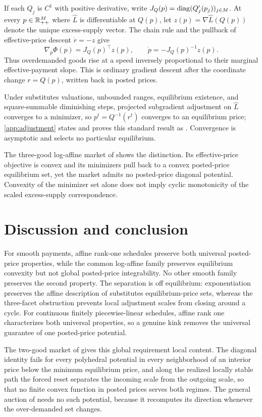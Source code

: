 If each $Q_j$ is $C^1$ with positive derivative, write $J_Q(p)=\operatorname{diag}(Q'_j(p_j))_{j\in M}$. At every $p\in\mathbb{R}_{++}^M$ where $\widehat L$ is differentiable at $Q(p)$, let $z(p)=\nabla\widehat L(Q(p))$ denote the unique excess-supply vector. The chain rule and the pullback of effective-price descent $\dot r=-z$ give
\begin{equation}\label{eq:smooth-pullback}
\nabla_p\Phi(p)=J_Q(p)^\top z(p),
\qquad
\dot p=-J_Q(p)^{-1}z(p).
\end{equation}
Thus overdemanded goods rise at a speed inversely proportional to their marginal effective-payment slope. This is ordinary gradient descent after the coordinate change $r=Q(p)$, written back in posted prices.

Under substitutes valuations, unbounded ranges, equilibrium existence, and square-summable diminishing steps, projected subgradient adjustment on $\widehat L$ converges to a minimizer, so $p^t=Q^{-1}(r^t)$ converges to an equilibrium price; \ref{app:adjustment} states and proves this standard result as . Convergence is asymptotic and selects no particular equilibrium.

The three-good log-affine market of  shows the distinction. Its effective-price objective is convex and its minimizers pull back to a convex posted-price equilibrium set, yet the market admits no posted-price diagonal potential. Convexity of the minimizer set alone does not imply cyclic monotonicity of the scaled excess-supply correspondence.

\section{Discussion and conclusion}\label{sec:discussion}

For smooth payments, affine rank-one schedules preserve both universal posted-price properties, while the common log-affine family preserves equilibrium convexity but not global posted-price integrability. No other smooth family preserves the second property. The separation is off equilibrium: exponentiation preserves the affine description of substitutes equilibrium-price sets, whereas the three-facet obstruction prevents local adjustment scales from closing around a cycle. For continuous finitely piecewise-linear schedules, affine rank one characterizes both universal properties, so a genuine kink removes the universal guarantee of one posted-price potential.

The two-good market of  gives this global requirement local content. The diagonal identity fails for every polyhedral potential in every neighborhood of an interior price below the minimum equilibrium price, and along the realized locally stable path the forced reset separates the incoming scale from the outgoing scale, so that no finite convex function in posted prices serves both regimes. The general auction of \citet{okisato2026} needs no such potential, because it recomputes its direction whenever the over-demanded set changes.

